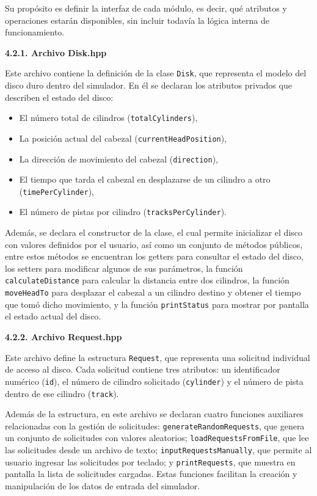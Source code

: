 \documentclass[14pt,letterpaper]{extarticle}
\begin{document}
Su propósito es definir la interfaz de cada módulo, es decir, qué atributos y operaciones estarán disponibles, sin incluir todavía la lógica interna de funcionamiento.

\textbf{4.2.1. Archivo Disk.hpp}

Este archivo contiene la definición de la clase \texttt{Disk}, que representa el modelo del disco duro dentro del simulador. En él se declaran los atributos privados que describen el estado del disco:

\begin{itemize}
    \item El número total de cilindros (\texttt{totalCylinders}),
    \item La posición actual del cabezal (\texttt{currentHeadPosition}),
    \item La dirección de movimiento del cabezal (\texttt{direction}),
    \item El tiempo que tarda el cabezal en desplazarse de un cilindro a otro (\texttt{timePerCylinder}),
    \item El número de pistas por cilindro (\texttt{tracksPerCylinder}).
\end{itemize}

Además, se declara el constructor de la clase, el cual permite inicializar el disco con valores definidos por el usuario, así como un conjunto de métodos públicos, entre estos métodos se encuentran los getters para consultar el estado del disco, los setters para modificar algunos de sus parámetros, la función \texttt{calculateDistance} para calcular la distancia entre dos cilindros, la función \texttt{moveHeadTo} para desplazar el cabezal a un cilindro destino y obtener el tiempo que tomó dicho movimiento, y la función \texttt{printStatus} para mostrar por pantalla el estado actual del disco.

\textbf{4.2.2. Archivo Request.hpp}

Este archivo define la estructura \texttt{Request}, que representa una solicitud individual de acceso al disco. Cada solicitud contiene tres atributos: un identificador numérico (\texttt{id}), el número de cilindro solicitado (\texttt{cylinder}) y el número de pista dentro de ese cilindro (\texttt{track}).

Además de la estructura, en este archivo se declaran cuatro funciones auxiliares relacionadas con la gestión de solicitudes: \texttt{generateRandomRequests}, que genera un conjunto de solicitudes con valores aleatorios; \texttt{loadRequestsFromFile}, que lee las solicitudes desde un archivo de texto; \texttt{inputRequestsManually}, que permite al usuario ingresar las solicitudes por teclado; y \texttt{printRequests}, que muestra en pantalla la lista de solicitudes cargadas. Estas funciones facilitan la creación y manipulación de los datos de entrada del simulador.
\end{document}
